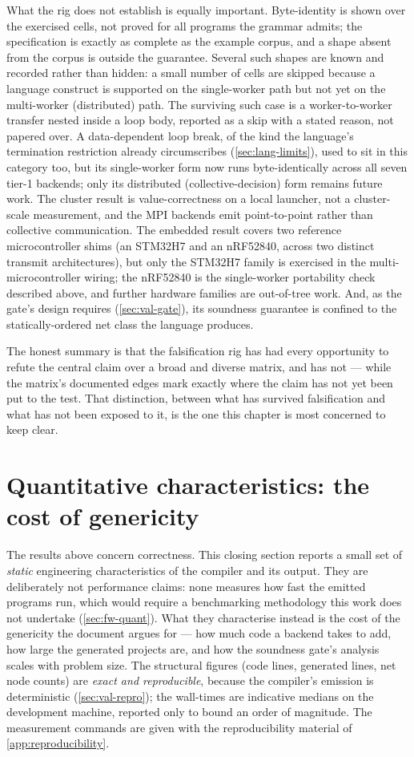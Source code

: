 What the rig does not establish is equally important. Byte-identity is shown over
the exercised cells, not proved for all programs the grammar admits; the
specification is exactly as complete as the example corpus, and a shape absent from
the corpus is outside the guarantee. Several such shapes are known and recorded
rather than hidden: a small number of cells are skipped because a language
construct is supported on the single-worker path but not yet on the multi-worker
(distributed) path. The surviving such case is a worker-to-worker transfer nested
inside a loop body, reported as a skip with a stated reason, not papered over. A
data-dependent loop break, of the kind the language's termination restriction already
circumscribes (\cref{sec:lang-limits}), used to sit in this category too, but its
single-worker form now runs byte-identically across all seven tier-1 backends; only its
distributed (collective-decision) form remains future work. The cluster result is
value-correctness on a local launcher, not a cluster-scale measurement, and the MPI
backends emit point-to-point rather than collective communication. The embedded
result covers two reference microcontroller shims (an STM32H7 and an nRF52840, across
two distinct transmit architectures), but only the STM32H7 family is exercised in the
multi-microcontroller wiring; the nRF52840 is the single-worker portability check
described above, and further hardware families are out-of-tree work. And, as the gate's design requires
(\cref{sec:val-gate}), its
soundness guarantee is confined to the statically-ordered net class the
language produces.

The honest summary is that the falsification rig has had every opportunity to refute
the central claim over a broad and diverse matrix, and has not --- while the matrix's
documented edges mark exactly where the claim has not yet been put to the test.
That distinction, between what has survived falsification and what has not been
exposed to it, is the one this chapter is most concerned to keep clear.

\section{Quantitative characteristics: the cost of genericity}\label{sec:res-quant}

The results above concern correctness. This closing section reports a small set of
\emph{static} engineering characteristics of the compiler and its output. They are
deliberately not performance claims: none measures how fast the emitted programs
run, which would require a benchmarking methodology this work does not undertake
(\cref{sec:fw-quant}). What they characterise instead is the cost of the genericity
the document argues for --- how much code a backend takes to add, how large the
generated projects are, and how the soundness gate's analysis scales with problem
size. The structural figures (code lines, generated lines, net node counts) are
\emph{exact and reproducible}, because the compiler's emission is deterministic
(\cref{sec:val-repro}); the wall-times are indicative medians on the development
machine, reported only to bound an order of magnitude. The measurement commands are
given with the reproducibility material of \cref{app:reproducibility}.

